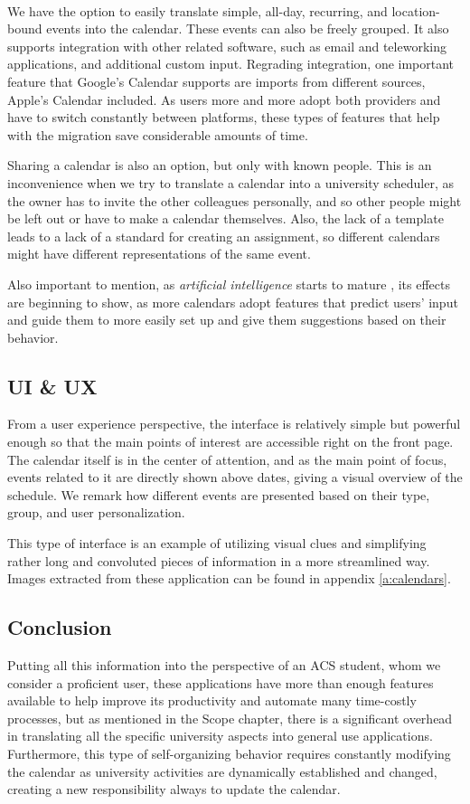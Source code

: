 ~

We have the option to easily translate simple, all-day, recurring, and location-bound events into the calendar. These events can also be freely grouped. It also supports integration with other related software, such as email and teleworking applications, and additional custom input. 
Regrading integration, one important feature that Google’s Calendar supports are imports from different sources, Apple’s Calendar included. As users more and more adopt both providers and have to switch constantly between platforms, these types of features that help with the migration save considerable amounts of time.

Sharing a calendar is also an option, but only with known people. This is an inconvenience when we try to translate a calendar into a university scheduler, as the owner has to invite the other colleagues personally, and so other people might be left out or have to make a calendar themselves. Also, the lack of a template leads to a lack of a standard for creating an assignment, so different calendars might have different representations of the same event.

Also important to mention, as \textit{artificial intelligence} starts to mature \cite{google2016ai}, its effects are beginning to show, as more calendars adopt features that predict users’ input and guide them to more easily set up and give them suggestions based on their behavior.


\subsection{UI \& UX} \label{3:generalapp_ui} 
From a user experience perspective, the interface is relatively simple but powerful enough so that the main points of interest are accessible right on the front page.
The calendar itself is in the center of attention, and as the main point of focus, events related to it are directly shown above dates, giving a visual overview of the schedule. We remark how different events are presented based on their type, group, and user personalization.    

This type of interface is an example of utilizing visual clues and simplifying rather long and convoluted pieces of information in a more streamlined way. Images extracted from these application can be found in appendix \ref{a:calendars}.


\subsection{Conclusion } \label{3:generalapp_conclusion}
Putting all this information into the perspective of an ACS student, whom we consider a proficient user, these applications have more than enough features available to help improve its productivity and automate many time-costly processes, but as mentioned in the Scope chapter, there is a significant overhead in translating all the specific university aspects into general use applications.
	Furthermore, this type of self-organizing behavior requires constantly modifying the calendar as university activities are dynamically established and changed, creating a new responsibility always to update the calendar. 
	
